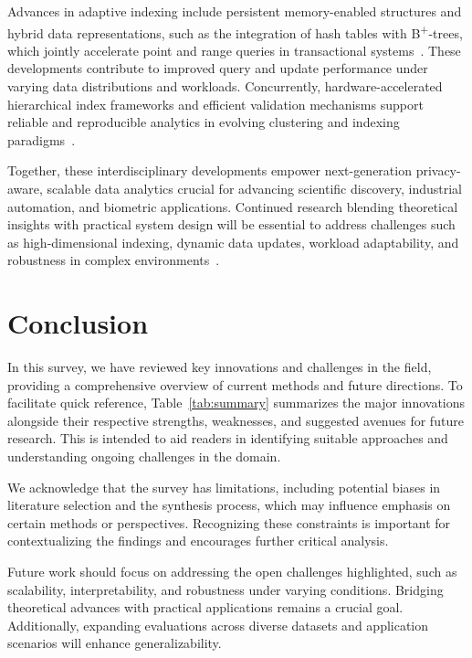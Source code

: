 \documentclass[sigconf]{acmart}
\begin{document}
Advances in adaptive indexing include persistent memory-enabled structures and hybrid data representations, such as the integration of hash tables with B\textsuperscript{+}-trees, which jointly accelerate point and range queries in transactional systems~\cite{ref32,ref35}. These developments contribute to improved query and update performance under varying data distributions and workloads. Concurrently, hardware-accelerated hierarchical index frameworks and efficient validation mechanisms support reliable and reproducible analytics in evolving clustering and indexing paradigms~\cite{ref24}.

Together, these interdisciplinary developments empower next-generation privacy-aware, scalable data analytics crucial for advancing scientific discovery, industrial automation, and biometric applications. Continued research blending theoretical insights with practical system design will be essential to address challenges such as high-dimensional indexing, dynamic data updates, workload adaptability, and robustness in complex environments~\cite{ref1,ref35}.

\section{Conclusion}

In this survey, we have reviewed key innovations and challenges in the field, providing a comprehensive overview of current methods and future directions. To facilitate quick reference, Table~\ref{tab:summary} summarizes the major innovations alongside their respective strengths, weaknesses, and suggested avenues for future research. This is intended to aid readers in identifying suitable approaches and understanding ongoing challenges in the domain.

We acknowledge that the survey has limitations, including potential biases in literature selection and the synthesis process, which may influence emphasis on certain methods or perspectives. Recognizing these constraints is important for contextualizing the findings and encourages further critical analysis.

Future work should focus on addressing the open challenges highlighted, such as scalability, interpretability, and robustness under varying conditions. Bridging theoretical advances with practical applications remains a crucial goal. Additionally, expanding evaluations across diverse datasets and application scenarios will enhance generalizability.
\end{document}
